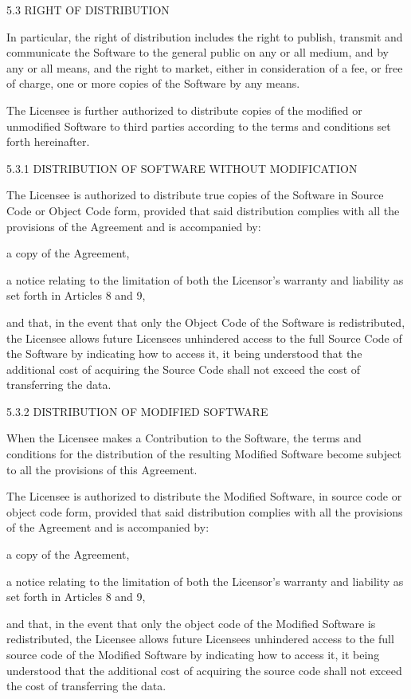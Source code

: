 \documentclass[oneside,english,onecolumn,letterpaper]{book}
\begin{document}
5.3 RIGHT OF DISTRIBUTION

In particular, the right of distribution includes the right to publish, transmit and communicate the Software to the general public on any or all medium, and by any or all means, and the right to market, either in consideration of a fee, or free of charge, one or more copies of the Software by any means.

The Licensee is further authorized to distribute copies of the modified or unmodified Software to third parties according to the terms and conditions set forth hereinafter.

5.3.1 DISTRIBUTION OF SOFTWARE WITHOUT MODIFICATION

The Licensee is authorized to distribute true copies of the Software in Source Code or Object Code form, provided that said distribution complies with all the provisions of the Agreement and is accompanied by:

a copy of the Agreement,

a notice relating to the limitation of both the Licensor's warranty and liability as set forth in Articles 8 and 9,

and that, in the event that only the Object Code of the Software is redistributed, the Licensee allows future Licensees unhindered access to the full Source Code of the Software by indicating how to access it, it being understood that the additional cost of acquiring the Source Code shall not exceed the cost of transferring the data.

5.3.2 DISTRIBUTION OF MODIFIED SOFTWARE

When the Licensee makes a Contribution to the Software, the terms and conditions for the distribution of the resulting Modified Software become subject to all the provisions of this Agreement.

The Licensee is authorized to distribute the Modified Software, in source code or object code form, provided that said distribution complies with all the provisions of the Agreement and is accompanied by:

a copy of the Agreement,

a notice relating to the limitation of both the Licensor's warranty and liability as set forth in Articles 8 and 9,

and that, in the event that only the object code of the Modified Software is redistributed, the Licensee allows future Licensees unhindered access to the full source code of the Modified Software by indicating how to access it, it being understood that the additional cost of acquiring the source code shall not exceed the cost of transferring the data.
\end{document}
